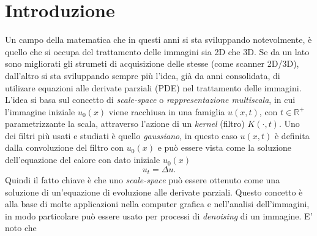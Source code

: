 \chapter*{Introduzione}
{}

Un campo della matematica che in questi anni si sta sviluppando
notevolmente, è quello che si occupa del trattamento delle immagini
sia 2D che 3D. Se da un lato sono migliorati gli strumeti di
acquisizione delle stesse (come  scanner 2D/3D), dall'altro si sta
sviluppando sempre più l'idea, già da anni consolidata, di utilizare
equazioni alle derivate parziali (PDE) nel trattamento delle
immagini. L'idea si basa sul concetto di \emph{scale-space} o
\emph{rappresentazione multiscala}, in cui l'immagine
iniziale $u_0(x)$ viene racchiusa in una famiglia $u(x,t)$, con
$t\in\mathbb{R}^+$ parametrizzante la scala, attraverso l'azione di un
\emph{kernel} (filtro) $K(\cdot,t)$. Uno dei filtri più
usati  e studiati è quello \emph{gaussiano}, in questo caso  $u(x,t)$
è definita dalla convoluzione del filtro con $u_0(x)$ e può essere
vista come la soluzione dell'equazione del calore con dato iniziale $u_0(x)$
\[
u_t=\Delta u.
\]
Quindi il fatto chiave è che uno \emph{scale-space} può essere
ottenuto come una soluzione di un'equazione di evoluzione alle
derivate parziali. 
Questo concetto è alla base di molte applicazioni nella computer
grafica e nell'analisi dell'immagini, in modo particolare può essere
usato per processi di \emph{denoising} di un immagine. E' noto che
